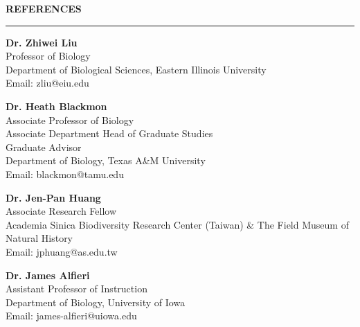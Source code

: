 \documentclass[11pt, a4paper]{article}
\begin{document}
\begin{center}
{\raggedright
\textbf{REFERENCES}\\
\vspace{-0.8em}
\noindent\rule{\linewidth}{0.4pt}

\textbf{Dr. Zhiwei Liu} \\
Professor of Biology \\
Department of Biological Sciences, Eastern Illinois University \\
Email: zliu@eiu.edu \\

\vspace{0.5em}

\textbf{Dr. Heath Blackmon} \\
Associate Professor of Biology \\
Associate Department Head of Graduate Studies \\
Graduate Advisor \\
Department of Biology, Texas A\&M University \\
Email: blackmon@tamu.edu \\

\vspace{0.5em}

\textbf{Dr. Jen-Pan Huang} \\
Associate Research Fellow \\
Academia Sinica Biodiversity Research Center (Taiwan) \& The Field Museum of Natural History\\
Email: jphuang@as.edu.tw \\

\vspace{0.5em}

\textbf{Dr. James Alfieri} \\
Assistant Professor of Instruction \\
Department of Biology, University of Iowa\\
Email: james-alfieri@uiowa.edu \\

}
          
\end{center}
\end{document}
